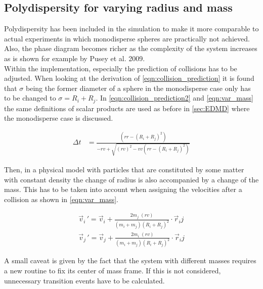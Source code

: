 \subsection{Polydispersity for varying radius and mass}
\label{sec:extension_radius}
Polydispersity has been included in the simulation to make it more comparable to actual experiments in which monodisperse spheres are practically not achieved. Also, the phase diagram becomes richer as the complexity of the system increases as is shown for example by Pusey et al. 2009\cite{Pusey2009}.\\ 
Within the implementation, especially the prediction of collisions has to be adjusted. When looking at the derivation of \autoref{eqn:collision_prediction} it is found that $\sigma$ being the former diameter of a sphere in the monodisperse case only has to be changed to $\sigma=R_i+R_j$. In \autoref{eqn:collision_prediction2} and \autoref{eqn:var_mass} the same definitions of scalar products are used as before in \autoref{sec:EDMD} where the monodisperse case is discussed.

\begin{align}
\label{eqn:collision_prediction2}
\Delta t &= \frac{\left(rr - (R_i+R_j)^2 \right)}{ - rv + \sqrt{ (rv)^2  - vv \left(rr - (R_i+R_j)^2 \right)}}
\end{align} 

Then, in a physical model with particles that are constituted by some matter with constant density the change of radius is also accompanied by a change of the mass. This has to be taken into account when assigning the velocities after a collision as shown in \autoref{eqn:var_mass}.

\begin{align}
\label{eqn:var_mass}
\vec{v}_i{\,'} = \vec{v}_i + \frac{2 m_j \; (rv)}{(m_i + m_j) (R_i+R_j)^2} \cdot \vec{r}_ij \nonumber \\
\vec{v}_j{\,'} = \vec{v}_j + \frac{2 m_i \; (rv)}{(m_i + m_j) (R_i+R_j)^2} \cdot \vec{r}_ij
\end{align}

A small caveat is given by the fact that the system with different masses requires a new routine to fix its center of mass frame. If this is not considered, unnecessary transition events have to be calculated.

